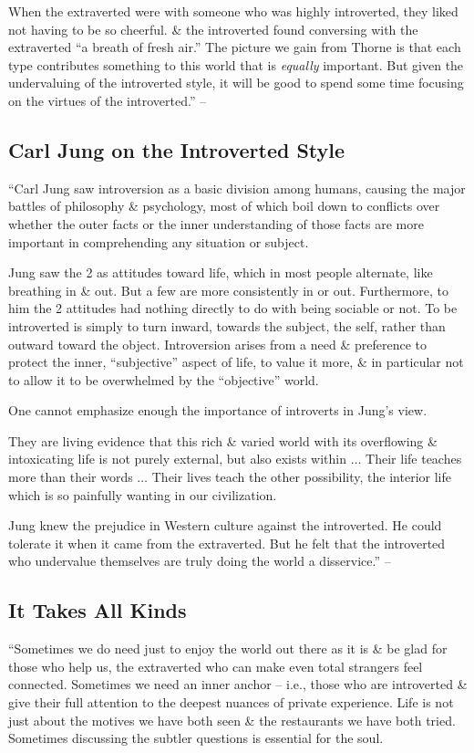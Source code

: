 \documentclass{article}
\numberwithin{equation}{section}
\begin{document}
When the extraverted were with someone who was highly introverted, they liked not having to be so cheerful. \& the introverted found conversing with the extraverted ``a breath of fresh air.'' The picture we gain from Thorne is that each type contributes something to this world that is \textit{equally} important. But given the undervaluing of the introverted style, it will be good to spend some time focusing on the virtues of the introverted.'' -- \cite[p. 131]{Aron2013}

\subsection{Carl Jung on the Introverted Style}
``Carl Jung saw introversion as a basic division among humans, causing the major battles of philosophy \& psychology, most of which boil down to conflicts over whether the outer facts or the inner understanding of those facts are more important in comprehending any situation or subject.

Jung saw the 2 as attitudes toward life, which in most people alternate, like breathing in \& out. But a few are more consistently in or out. Furthermore, to him the 2 attitudes had nothing directly to do with being sociable or not. To be introverted is simply to turn inward, towards the subject, the self, rather than outward toward the object. Introversion arises from a need \& preference to protect the inner, ``subjective'' aspect of life, to value it more, \& in particular not to allow it to be overwhelmed by the ``objective'' world. 

One cannot emphasize enough the importance of introverts in Jung's view.

They are living evidence that this rich \& varied world with its overflowing \& intoxicating life is not purely external, but also exists within $\ldots$ Their life teaches more than their words $\ldots$ Their lives teach the other possibility, the interior life which is so painfully wanting in our civilization.

Jung knew the prejudice in Western culture against the introverted. He could tolerate it when it came from the extraverted. But he felt that the introverted who undervalue themselves are truly doing the world a disservice.'' -- \cite[pp. 131--132]{Aron2013}

\subsection{It Takes All Kinds}
``Sometimes we do need just to enjoy the world out there as it is \& be glad for those who help us, the extraverted who can make even total strangers feel connected. Sometimes we need an inner anchor -- i.e., those who are introverted \& give their full attention to the deepest nuances of private experience. Life is not just about the motives we have both seen \& the restaurants we have both tried. Sometimes discussing the subtler questions is essential for the soul.
\end{document}
